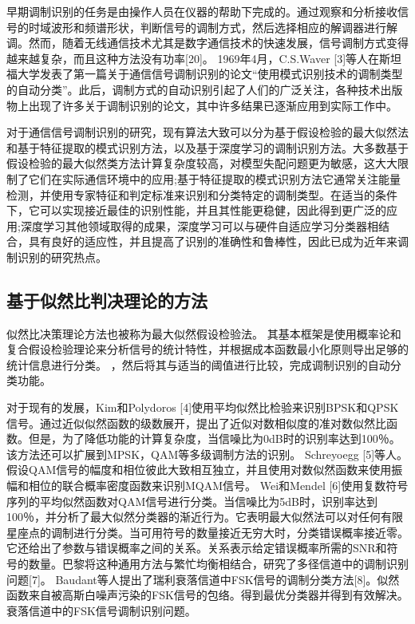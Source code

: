 早期调制识别的任务是由操作人员在仪器的帮助下完成的。通过观察和分析接收信号的时域波形和频谱形状，判断信号的调制方式，然后选择相应的解调器进行解调。然而，随着无线通信技术尤其是数字通信技术的快速发展，信号调制方式变得越来越复杂，而且这种方法没有功率[20]。 1969年4月，C.S.Waver [3]等人在斯坦福大学发表了第一篇关于通信信号调制识别的论文“使用模式识别技术的调制类型的自动分类”。此后，调制方式的自动识别引起了人们的广泛关注，各种技术出版物上出现了许多关于调制识别的论文，其中许多结果已逐渐应用到实际工作中。 \par

对于通信信号调制识别的研究，现有算法大致可以分为基于假设检验的最大似然法和基于特征提取的模式识别方法，以及基于深度学习的调制识别方法。大多数基于假设检验的最大似然类方法计算复杂度较高，对模型失配问题更为敏感，这大大限制了它们在实际通信环境中的应用;基于特征提取的模式识别方法它通常关注能量检测，并使用专家特征和判定标准来识别和分类特定的调制类型。在适当的条件下，它可以实现接近最佳的识别性能，并且其性能更稳健，因此得到更广泛的应用;深度学习其他领域取得的成果，深度学习可以与硬件自适应学习分类器相结合，具有良好的适应性，并且提高了识别的准确性和鲁棒性，因此已成为近年来调制识别的研究热点。\par

\subsection{基于似然比判决理论的方法}

似然比决策理论方法也被称为最大似然假设检验法。 其基本框架是使用概率论和复合假设检验理论来分析信号的统计特性，并根据成本函数最小化原则导出足够的统计信息进行分类。 ，然后将其与适当的阈值进行比较，完成调制识别的自动分类功能。\par

对于现有的发展，Kim和Polydoros [4]使用平均似然比检验来识别BPSK和QPSK信号。通过近似似然函数的级数展开，提出了近似对数相似度的准对数似然比函数。但是，为了降低功能的计算复杂度，当信噪比为0dB时的识别率达到100％。该方法还可以扩展到MPSK，QAM等多级调制方法的识别。 Schreyoegg [5]等人。假设QAM信号的幅度和相位彼此大致相互独立，并且使用对数似然函数来使用振幅和相位的联合概率密度函数来识别MQAM信号。 Wei和Mendel [6]使用复数符号序列的平均似然函数对QAM信号进行分类。当信噪比为5dB时，识别率达到100％，并分析了最大似然分类器的渐近行为。它表明最大似然法可以对任何有限星座点的调制进行分类。当可用符号的数量接近无穷大时，分类错误概率接近零。它还给出了参数与错误概率之间的关系。关系表示给定错误概率所需的SNR和符号的数量。巴黎将这种通用方法与繁忙均衡相结合，研究了多径信道中的调制识别问题[7]。 Baudant等人提出了瑞利衰落信道中FSK信号的调制分类方法[8]。似然函数来自被高斯白噪声污染的FSK信号的包络。得到最优分类器并得到有效解决。衰落信道中的FSK信号调制识别问题。\par
 
